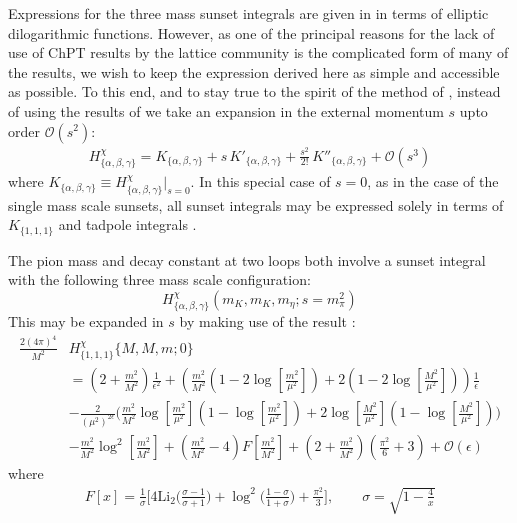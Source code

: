 \documentclass[12pt,a4paper]{article}
\begin{document}
Expressions for the three mass sunset integrals are given in \cite{Adams:2015gva} in terms of elliptic dilogarithmic functions. However, as one of the principal reasons for the lack of use of ChPT results by the lattice community is the complicated form of many of the results, we wish to keep the expression derived here as simple and accessible as possible. To this end, and to stay true to the spirit of the method of \cite{Kaiser:2007kf}, instead of using the results of \cite{Adams:2015gva} we take an expansion in the external momentum $s$ upto order $\mathcal{O}(s^2)$:
\begin{align}
	H^{\chi}_{\{\alpha,\beta,\gamma\}} = K_{\{\alpha,\beta,\gamma\}} + s \, K'_{\{\alpha,\beta,\gamma\}} + \frac{s^2}{2!} \, K''_{\{\alpha,\beta,\gamma\}} + \mathcal{O}(s^3)  
\end{align}
where $K_{\{\alpha,\beta,\gamma\}} \equiv H^{\chi}_{\{\alpha,\beta,\gamma\}} |_{s=0}$. In this special case of $s=0$, as in the case of the single mass scale sunsets, all sunset integrals may be expressed solely in terms of $K_{\{1,1,1\}}$ and tadpole integrals \cite{Tarasov:1997kx}.

The pion mass and decay constant at two loops both involve a sunset integral with the following three mass scale configuration: \[ H^{\chi}_{\{\alpha,\beta,\gamma\}} \left( m_{K}, m_{K}, m_{\eta}; s=m_{\pi}^2 \right) \] This may be expanded in $s$ by making use of the result \cite{Amoros:1999dp, Kaiser:2007kf, Davydychev:1992mt}:
\begin{align}
	\frac{2 \left( 4 \pi \right)^4}{M^2} & H^{\chi}_{\{1,1,1\}}\{M,M,m;0\} \nonumber \\	
	& = \left( 2 + \frac{m^2}{M^2} \right) \frac{1}{\epsilon^2} + \left( \frac{m^2}{M^2} \left( 1 - 2  \log \left[ \frac{m^2}{\mu^2} \right] \right) + 2 \left( 1 - 2  \log \left[ \frac{M^2}{\mu^2} \right] \right) \right) \frac{1}{\epsilon} \nonumber \\
	& - \frac{2}{(\mu^2)^{2\epsilon}} \bigg( \frac{m^2}{M^2} \log \left[ \frac{m^2}{\mu^2} \right] \left( 1 - \log \left[ \frac{m^2}{\mu^2} \right] \right) + 2 \log \left[ \frac{M^2}{\mu^2} \right] \left( 1 - \log \left[ \frac{M^2}{\mu^2} \right] \right) \bigg) \nonumber \\
	& - \frac{m^2}{M^2} \log^2 \left[ \frac{m^2}{M^2} \right] + \left( \frac{m^2}{M^2} - 4 \right) F \left[ \frac{m^2}{M^2} \right] + \left( 2 + \frac{m^2}{M^2} \right) \left( \frac{\pi^2}{6} + 3 \right) + \mathcal{O}(\epsilon) \label{K111}
\end{align}
where 
\begin{align}
F[x] = \frac{1}{\sigma} \bigg[ 4 \text{Li}_2 \bigg( \frac{\sigma-1}{\sigma+1} \bigg) + \log^2 \bigg( \frac{1-\sigma}{1+\sigma} \bigg) + \frac{\pi^2}{3} \bigg] , \qquad \sigma = \sqrt{1-\frac{4}{x}}  \label{Fdef}
\end{align}
\end{document}
